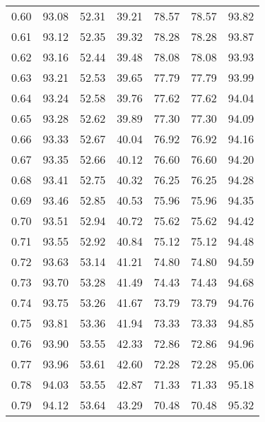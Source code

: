 \begin{tabular}{|c|c|c|c|c|c|c|}
      0.60 &     93.08 &     52.31 &      39.21 &   78.57 &      78.57 &         93.82 \\
      0.61 &     93.12 &     52.35 &      39.32 &   78.28 &      78.28 &         93.87 \\
      0.62 &     93.16 &     52.44 &      39.48 &   78.08 &      78.08 &         93.93 \\
      0.63 &     93.21 &     52.53 &      39.65 &   77.79 &      77.79 &         93.99 \\
      0.64 &     93.24 &     52.58 &      39.76 &   77.62 &      77.62 &         94.04 \\
      0.65 &     93.28 &     52.62 &      39.89 &   77.30 &      77.30 &         94.09 \\
      0.66 &     93.33 &     52.67 &      40.04 &   76.92 &      76.92 &         94.16 \\
      0.67 &     93.35 &     52.66 &      40.12 &   76.60 &      76.60 &         94.20 \\
      0.68 &     93.41 &     52.75 &      40.32 &   76.25 &      76.25 &         94.28 \\
      0.69 &     93.46 &     52.85 &      40.53 &   75.96 &      75.96 &         94.35 \\
      0.70 &     93.51 &     52.94 &      40.72 &   75.62 &      75.62 &         94.42 \\
      0.71 &     93.55 &     52.92 &      40.84 &   75.12 &      75.12 &         94.48 \\
      0.72 &     93.63 &     53.14 &      41.21 &   74.80 &      74.80 &         94.59 \\
      0.73 &     93.70 &     53.28 &      41.49 &   74.43 &      74.43 &         94.68 \\
      0.74 &     93.75 &     53.26 &      41.67 &   73.79 &      73.79 &         94.76 \\
      0.75 &     93.81 &     53.36 &      41.94 &   73.33 &      73.33 &         94.85 \\
      0.76 &     93.90 &     53.55 &      42.33 &   72.86 &      72.86 &         94.96 \\
      0.77 &     93.96 &     53.61 &      42.60 &   72.28 &      72.28 &         95.06 \\
      0.78 &     94.03 &     53.55 &      42.87 &   71.33 &      71.33 &         95.18 \\
      0.79 &     94.12 &     53.64 &      43.29 &   70.48 &      70.48 &         95.32 \\

\end{tabular}
